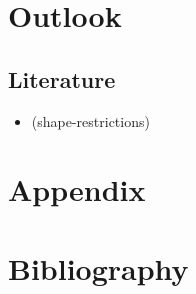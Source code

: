 \documentclass[11pt,twoside,a4paper]{article}
\begin{document}
	\section{Outlook}
	
	\subsection{Literature}
	\begin{itemize}
		\item \cite{James.2009} (shape-restrictions)
	\end{itemize}
	
	\section{Appendix}
	
	\newpage
	
	\section{Bibliography}
	\printbibliography[heading=none]	
	
\end{document}
